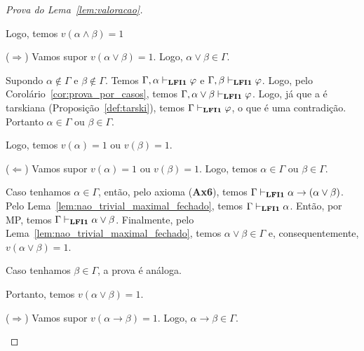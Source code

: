 \begin{proof}[Prova do Lema~\ref{lem:valoracao}]
\begin{provaporcasos}
\begin{adjustwidth}{1cm}{}
                        Logo, temos $v(\alpha \land \beta) = 1$

                    \end{adjustwidth}


                    \begin{adjustwidth}{1cm}{}
                        \noindent ($\Longrightarrow$) Vamos supor $v(\alpha \lor \beta) = 1$. Logo, $\alpha \lor \beta \in \Gamma$.

                        \noindent Supondo $\alpha \notin \Gamma$ e $\beta \notin \Gamma$. Temos $\Gamma, \alpha \vdash_{{\normalfont\textbf{LFI1}}{}} \varphi$ e $\Gamma, \beta \vdash_{{\normalfont\textbf{LFI1}}{}} \varphi$. Logo, pelo Corolário~\ref{cor:prova_por_casos}, temos $\Gamma, \alpha \lor \beta \vdash_{{\normalfont\textbf{LFI1}}{}} \varphi$. Logo, já que a \lfium{} é tarskiana (Proposição~\ref{def:tarski}), temos $\Gamma \vdash_{{\normalfont\textbf{LFI1}}{}} \varphi$, o que é uma contradição. Portanto $\alpha \in \Gamma$ ou $\beta \in \Gamma$.
                        
                        \noindent Logo, temos $v(\alpha) = 1$ ou $v(\beta) = 1$.

                        \noindent ($\Longleftarrow$) Vamos supor $v(\alpha) = 1$ ou $v(\beta) = 1$. Logo, temos $\alpha \in \Gamma$ ou $\beta \in \Gamma$.

                        \noindent Caso tenhamos $\alpha \in \Gamma$, então, pelo axioma (\textbf{Ax6}), temos $\Gamma \vdash_{{\normalfont\textbf{LFI1}}{}} \alpha \to (\alpha \lor \beta)$. Pelo Lema~\ref{lem:nao_trivial_maximal_fechado}, temos $\Gamma \vdash_{{\normalfont\textbf{LFI1}}{}} \alpha$. Então, por MP, temos $\Gamma \vdash_{{\normalfont\textbf{LFI1}}{}} \alpha \lor \beta$. Finalmente, pelo Lema~\ref{lem:nao_trivial_maximal_fechado}, temos $\alpha \lor \beta \in \Gamma$ e, consequentemente, $v(\alpha \lor \beta) = 1$.

                        \noindent Caso tenhamos $\beta \in \Gamma$, a prova é análoga.

                        \noindent Portanto, temos $v(\alpha \lor \beta) = 1$.

                    \end{adjustwidth}


                        \begin{adjustwidth}{1cm}{}
                            
                            \noindent ($\Longrightarrow$) Vamos supor $v(\alpha \to \beta) = 1$. Logo, $\alpha \to \beta \in \Gamma$.


\end{adjustwidth}
\end{provaporcasos}
\end{proof}
